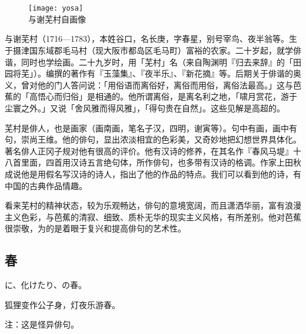 \chapter[{\FM 与謝蕪村}]{\FM {}}

\begin{center}
    \begin{figure}
        \centering
        \texttt{[image: yosa]}\\[1em]
        \large{\FS 与谢芜村自画像}
    \end{figure}
\end{center}

\newpage

{\FS
    与谢芜村（1716—1783），本姓谷口，名长庚，字春星，别号宰鸟、夜半翁等。生于摄津国东域郡毛马村（现大阪市都岛区毛马町）富裕的农家。二十岁起，就学俳谐，同时也学绘画。二十九岁时，用「芜村」名（来自陶渊明『归去来辞』的「田园将芜」）。编撰的著作有『玉藻集』、『夜半乐』、『新花摘』等。后期关于俳谐的奥义，曾对他的门人答问说：「用俗语而离俗好，离俗而用俗，离俗法最高。」这与芭蕉的「高悟心而归俗」是相通的。他所谓离俗，是离名利之地，「啸月赏花，游于尘寰之外。」又说「舍风雅而得风雅」，「得句贵在自然」。这些见解是高超的。

    芜村是俳人，也是画家（画南画，笔名子汉，四明，谢寅等）。句中有画，画中有句，崇尚王维。他的俳句，显出浓淡相宜的色彩美，又奇妙地把幻想世界具体化。著名俳人正冈子规对他有很高的评价。他有汉诗的修养，在其名作『春风马堤』\footnotemark[1]十八首里面，四首用汉诗五言绝句体，所作俳句，也多带有汉诗的格调。作家上田秋成说他是用假名写汉诗的诗人，指出了他的作品的特点。我们可以看到他的诗，有中国的古典作品情趣。

    看来芜村的精神状态，较为乐观畅达，俳句的意境宽阔，而且潇洒华丽，富有浪漫主义色彩，与芭蕉的清寂、细致、质朴无华的现实主义风格，有所差别。他对芭蕉很崇敬，为的是着眼于复兴和提高俳句的艺术性。
}

\newpage

\section{\FK 春}

\setcounter{haikucounter}{0}

\begin{haiku}
    {\FH {}に、化けたり、の春。}

    {\FK 狐狸变作公子身，灯夜乐游春。}

    {\FT 注：这是怪异俳句。}
\end{haiku}

